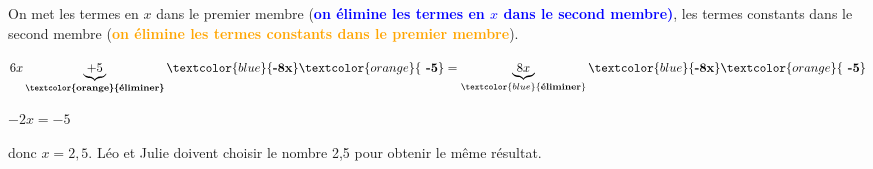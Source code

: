\begin{enumerate}
On met les termes en $x$ dans le premier membre (\textcolor{blue}{\textbf{on élimine les termes en $x$ dans le second membre)}}, les termes constants dans le second membre (\textcolor{orange}{\textbf{on élimine les termes constants dans le premier membre}}).

$6x\underbrace{+5}_{\textbf{\textcolor{orange}{éliminer}}} \textcolor{blue}{\textbf{-8x}} \textcolor{orange}{\textbf{~-5}}=\underbrace{8x}_{\textcolor{blue}{\textbf{éliminer}}} \textcolor{blue}{\textbf{-8x}} \textcolor{orange}{\textbf{~-5}}$



$-2x=-5$

donc $x=2,5$. \quad Léo et Julie doivent choisir le nombre 2,5 pour obtenir le même résultat.
\end{enumerate}

\vspace{0.5cm}

